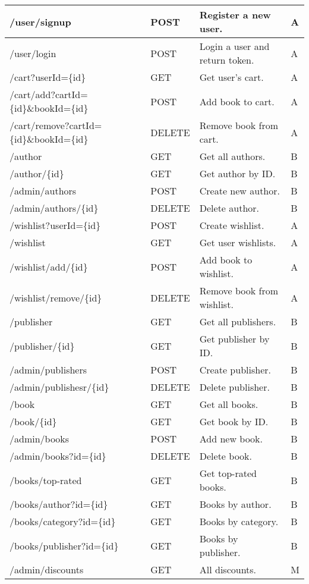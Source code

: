 \begin{longtable}{|p{}|p{} |p{}|p{}|}
    /user/signup & POST & Register a new user. & A \\
    \hline
    /user/login & POST & Login a user and return token. & A \\
    \hline
    /cart?userId=\{id\} & GET & Get user’s cart. & A \\
    \hline
    /cart/add?cartId=\{id\}\&bookId=\{id\} & POST & Add book to cart. & A \\
    \hline
    /cart/remove?cartId=\{id\}\&bookId=\{id\} & DELETE & Remove book from cart. & A \\
    \hline
    /author & GET & Get all authors. & B \\
    \hline
    /author/\{id\} & GET & Get author by ID. & B \\
    \hline
    /admin/authors & POST & Create new author. & B \\
    \hline
    /admin/authors/\{id\} & DELETE & Delete author. & B \\
    \hline
    /wishlist?userId=\{id\} & POST & Create wishlist. & A \\
    \hline
    /wishlist & GET & Get user wishlists. & A \\
    \hline
    /wishlist/add/\{id\} & POST & Add book to wishlist. & A \\
    \hline
    /wishlist/remove/\{id\} & DELETE & Remove book from wishlist. & A \\
    \hline
    /publisher & GET & Get all publishers. & B \\
    \hline
    /publisher/\{id\} & GET & Get publisher by ID. & B \\
    \hline
    /admin/publishers & POST & Create publisher. & B \\
    \hline
    /admin/publishesr/\{id\} & DELETE & Delete publisher. & B \\
    \hline
    /book & GET & Get all books. & B \\
    \hline
    /book/\{id\} & GET & Get book by ID. & B \\
    \hline
    /admin/books & POST & Add new book. & B \\
    \hline
    /admin/books?id=\{id\} & DELETE & Delete book. & B \\
    \hline
    /books/top-rated & GET & Get top-rated books. & B \\
    \hline
    /books/author?id=\{id\} & GET & Books by author. & B \\
    \hline
    /books/category?id=\{id\} & GET & Books by category. & B \\
    \hline
    /books/publisher?id=\{id\} & GET & Books by publisher. & B \\
    \hline
    /admin/discounts & GET & All discounts. & M \\
    \hline


\end{longtable}
